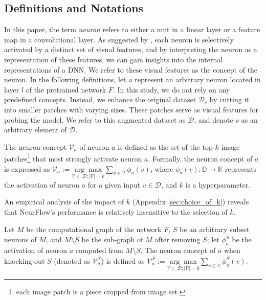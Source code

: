 \subsection{Definitions and Notations}
\label{def_not}
In this paper, the term \emph{neuron} refers to either a unit in a linear layer or a feature map in a convolutional layer. As suggested by \citet{Olah, Invert, Polysemantic}, each neuron is selectively activated by a distinct set of visual features, and by interpreting the neuron as a representation of these features, we can gain insights into the internal representations of a DNN. We refer to these visual features as the concept of the neuron. In the following definitions, let $a$ represent an arbitrary neuron located in layer $l$ of the pretrained network $F$. 
In this study, we do not rely on any predefined concepts. Instead, we enhance the original dataset $\mathcal{D}_c$ by cutting it into smaller patches with varying sizes. These patches serve as visual features for probing the model. We refer to this augmented dataset as $\mathcal{D}$, and denote $v$ as an arbitrary element of $\mathcal{D}$.

\begin{mydef}
\label{def:neuron concept}
    The neuron concept $\mathcal{V}_{a}$ of neuron $a$ is defined as the set of the top-$k$ image patches\footnote{each image patch is a piece cropped from image set.} that most strongly activate neuron $a$. Formally, the neuron concept of $a$ is expressed as $\mathcal{V}_{a} :=\underset{\mathcal{V} \subset \mathcal{D}; |\mathcal{V}| = k}{\arg \max} \sum_{v \in \mathcal{V}} \phi_{a}(v)$, where $\phi_{a}(v): \mathbb{D} \xrightarrow{} \mathbb{R}$ represents the activation of neuron $a$ for a given input $v \in \mathcal{D}$, and $k$ is a hyperparameter.
\end{mydef}
An empirical analysis of the impact of $k$ (Appendix \ref{sec:choice_of_k}) reveals that NeurFlow's performance is relatively insensitive to the selection of $k$.

\begin{mydef}
    Let $M$ be the computational graph of the network $F$, $S$ be an arbitrary subset neurons of $M$, and $M \setminus S$ be the sub-graph of $M$ after removing $S$; let $\phi^{\overline{S}}_{a}$ be the activation of neuron $a$ computed from $M \setminus S$. 
    The neuron concept of $a$ when knocking-out $S$ (denoted as $\mathcal{V}^{\overline{S}}_{a}$) is defined as $\mathcal{V}^{\overline{S}}_{a} := \underset{\mathcal{V} \subset \mathcal{D}; |\mathcal{V}| = k}{\arg \max} \sum_{v \in \mathcal{V}} \phi^{\overline{S}}_{a}(v)$. 
\end{mydef}

